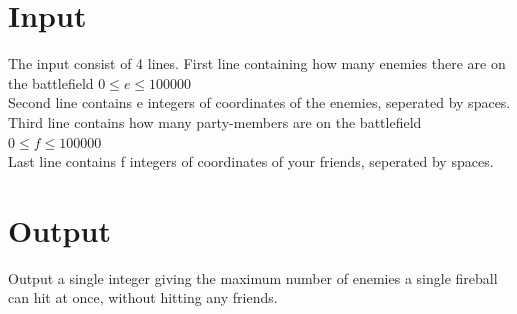 \section*{Input}

The input consist of 4 lines. 
First line containing how many enemies there are on the battlefield $0 \leq e \leq 100000$\\
Second line contains e integers of coordinates of the enemies, seperated by spaces.\\
Third line contains how many party-members are on the battlefield $0 \leq f \leq 100000$ \\
Last line contains f integers of coordinates of your friends, seperated by spaces.

\section*{Output}

Output a single integer giving the maximum number of enemies a single fireball can hit at once, without hitting any friends. 
